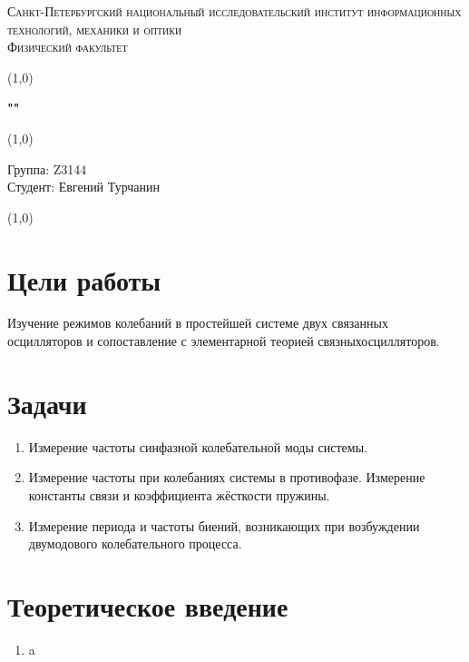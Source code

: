 \documentclass[a4paper]{article}
\begin{document}
\begin{center}
\textsc{Санкт-Петербургский национальный исследовательский институт информационных технологий, механики и оптики\\[3mm]
Физический факультет} \\[3mm]

\end{center}
\vspace{5mm}
\line(1,0){\textwidth}
\begin{center}
\textbf{""}
\end{center}
\vspace{2mm}
\line(1,0){\textwidth}
\vspace{5mm}
\begin{minipage}{0.4\textwidth}
    Группа: Z3144 \\
    Студент: Евгений Турчанин\\
    \vspace{1mm}
\end{minipage}
\hfill
\vspace{1mm}
\line(1,0){\textwidth}


\section{ \textbf{Цели работы}}

Изучение режимов колебаний в простейшей системе двух связанных осцилляторов и сопоставление с элементарной теорией связныхосцилляторов.

\section{\textbf{Задачи}}

\begin{enumerate}
    \item  Измерение частоты синфазной колебательной моды системы.
    \item  Измерение частоты при колебаниях системы в противофазе.
Измерение константы связи и коэффициента жёсткости пружины.
    \item  Измерение периода и частоты биений, возникающих при возбуждении двумодового колебательного процесса.
\end{enumerate}


\section{\textbf{Теоретическое введение}}

\begin{enumerate}
    \item a
\end{enumerate}
\end{document}
